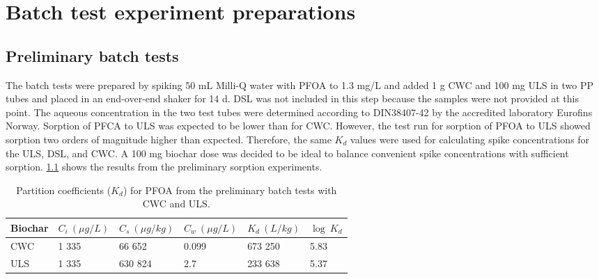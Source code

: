 \chapter{Batch test experiment preparations}\label{appSec:IsothermSetup}

\section{Preliminary batch tests}
The batch tests were prepared by spiking 50 mL Milli-Q water with PFOA to 1.3 mg/L and added 1 g CWC and 100 mg ULS in two PP tubes and placed in an end-over-end shaker for 14 d. DSL was not included in this step because the samples were not provided at this point. The aqueous concentration in the two test tubes were determined according to DIN38407-42 by the accredited laboratory Eurofins Norway. Sorption of PFCA to ULS was expected to be lower than for CWC. However, the test run for sorption of PFOA to ULS showed sorption two orders of magnitude higher than expected. Therefore, the same $K_d$ values were used for calculating spike concentrations for the ULS, DSL, and CWC. A 100 mg biochar dose was decided to be ideal to balance convenient spike concentrations with sufficient sorption. \cref{apptab:prelim} shows the results from the preliminary sorption experiments. 

\begin{table}
\centering
\caption{Partition coefficients ($K_d$) for PFOA from the preliminary batch tests with CWC and ULS.}
\label{apptab:prelim}
\begin{tabular}{llllll} \toprule
Biochar & $C_i~(\mu g/L)$ & $C_s~(\mu g/kg)$ & $C_w~(\mu g/L)$ & $K_d~(L/kg)$ & $\log~K_d$ \\ \midrule
CWC & 1 335 & 66 652 & 0.099 & 673 250 & 5.83 \\
ULS & 1 335 & 630 824 & 2.7 & 233 638 & 5.37 \\ \bottomrule
\end{tabular}
\end{table}

